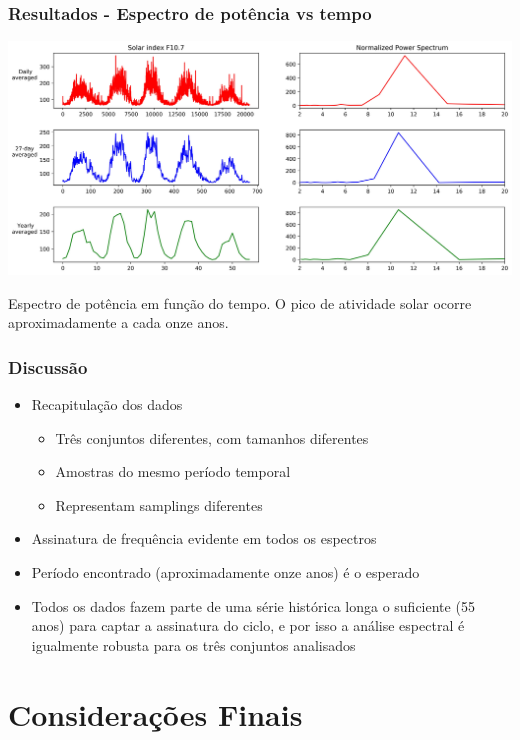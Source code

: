 \documentclass{beamer}
\begin{document}
\begin{frame}
\frametitle{Resultados - Espectro de potência vs tempo}
\begin{center}
\includegraphics[scale=0.376]{Figuras/final_t2.jpg}
\end{center}
Espectro de potência em função do tempo. O pico de atividade solar ocorre aproximadamente a cada onze anos.
\end{frame}

\begin{frame}
\frametitle{Discussão}
\begin{itemize}
\item Recapitulação dos dados
\begin{itemize}
\item Três conjuntos diferentes, com tamanhos diferentes
\item Amostras do mesmo período temporal
\item Representam samplings diferentes
\end{itemize}
\item Assinatura de frequência evidente em todos os espectros
\item Período encontrado (aproximadamente onze anos) é o esperado
\item Todos os dados fazem parte de uma série histórica longa o suficiente (55 anos) para captar a assinatura do ciclo, e por isso a análise espectral é igualmente robusta para os três conjuntos analisados
\end{itemize}
\end{frame}


\section{Considerações Finais}
\end{document}
